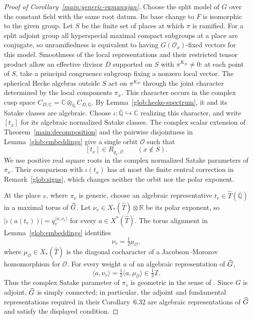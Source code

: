 \begin{proof}[Proof of Corollary~\ref{main:generic-ramanujan}]
Choose the split model of $G$ over the constant field with the same
root datum. Its base change to $F$ is isomorphic to the given group.
Let $S$ be the finite set of places at which $\pi$ is ramified.
For a split adjoint group all hyperspecial maximal compact subgroups
at a place are conjugate, so unramifiedness is equivalent to having
$G(\mathcal O_x)$-fixed vectors for this model. Smoothness of the local
representations and their restricted tensor product allow an effective
divisor $D$ supported on $S$ with $\pi^{K_D}\ne0$: at each point of $S$,
take a principal congruence subgroup fixing a nonzero local vector.
The spherical Hecke algebras outside $S$ act on $\pi^{K_D}$ through the
joint character determined by the local components $\pi_x$.
This character occurs in the complex cusp space
$C_{D,\mathbb C}=\mathbb C\otimes_{\mathbb Q}C_{D,\mathbb Q}$.
By Lemma~\ref{glob:hecke-spectrum}, it and its Satake classes are
algebraic. Choose $\iota:\overline{\mathbb Q}\hookrightarrow\mathbb C$
realizing this character, and write $[t_x]$ for its algebraic normalized
Satake classes. The complex scalar extension of
Theorem~\ref{main:decomposition} and the
pairwise disjointness in Lemma~\ref{glob:embeddings} give a single orbit
$\mathcal O$ such that
\[
                 [t_x]\in R_{q_x,\mathcal O}
                 \qquad (x\notin S).
\]
We use positive real square roots in the complex normalized Satake
parameters of $\pi_x$. Their comparison with $\iota(t_x)$ has at most
the finite central correction in Remark~\ref{glob:signs}, which changes
neither the orbit nor the polar exponent.

At the place $v$, where $\pi_v$ is generic, choose an algebraic representative
$t_v\in\widehat T(\overline{\mathbb Q})$ in a maximal torus of $\widehat G$.
Let $\nu_v\in X_*(\widehat T)\otimes\mathbb R$
be its polar exponent, so
$|\iota(a(t_v))|=q_v^{\langle a,\nu_v\rangle}$ for every
$a\in X^*(\widehat T)$. The torus alignment in
Lemma~\ref{glob:embeddings} identifies
\[
                  \nu_v=\tfrac12\mu_{\mathcal O},
\]
where $\mu_{\mathcal O}\in X_*(\widehat T)$ is the diagonal
cocharacter of a Jacobson--Morozov homomorphism for $\mathcal O$.
For every weight $a$ of an algebraic representation of $\widehat G$,
\[
        \langle a,\nu_v\rangle
             =\tfrac12\langle a,\mu_{\mathcal O}\rangle
             \in\tfrac12\mathbb Z.
\]
Thus the complex Satake parameter of $\pi_v$ is geometric in the sense of
\cite[Definition~6.3]{CiubotaruHarris}. Since $G$ is adjoint, $\widehat G$ is
simply connected; in particular, the adjoint and fundamental
representations required in their Corollary~6.32 are algebraic
representations of $\widehat G$ and satisfy the displayed condition.


\end{proof}

